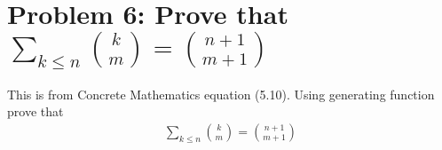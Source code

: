 ﻿\section{Problem 6: Prove that $\sum_{k \leq n} \binom{k}{m} = \binom{n+1}{m+1}$}
\label{sec:problem-6}
This is from Concrete Mathematics equation (5.10).
Using generating function prove that
\begin{align}
    \sum_{k \leq n} \binom{k}{m} = \binom{n+1}{m+1}
    \label{eq:identity-to-prove-problem-6}
\end{align}

\clearpage
